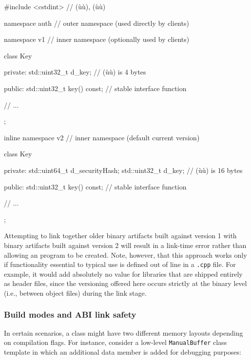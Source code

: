 \begin{emcppslisting}
#include <cstdint>  // (ù{}ù), (ù{}ù)

namespace auth      // outer namespace (used directly by clients)
{
    namespace v1    // inner namespace (optionally used by clients)
    {
        class Key
        {
        private:
            std::uint32_t d_key;
                // (ù{}ù) is 4 bytes

        public:
            std::uint32_t key() const;  // stable interface function

            // ...
        };
    }

    inline namespace v2    // inner namespace (default current version)
    {
        class Key
        {
        private:
            std::uint64_t d_securityHash;
            std::uint32_t d_key;
                // (ù{}ù) is 16 bytes

        public:
            std::uint32_t key() const;  // stable interface function

            // ...
        };
    }
}
\end{emcppslisting}

\noindent Attempting to link together older binary artifacts built against version
1 with binary artifacts built against version 2 will result in a
link-time error rather than allowing an  program to
be created. Note, however, that this approach works only if functionality essential
to typical use is defined out of line in a \lstinline!.cpp! file. For example, it would add absolutely no value for libraries that are
shipped entirely as header files, since the versioning offered here
occurs strictly at the binary level (i.e., between object files)
during the link stage.

\subsubsection[Build modes and ABI link safety]{Build modes and ABI link safety}\label{build-modes-and-abi-link-safety}

In certain scenarios, a class might have two different memory layouts
depending on compilation flags. For instance, consider a low-level
\lstinline!ManualBuffer! class template in which an additional data member
is added for debugging purposes:

